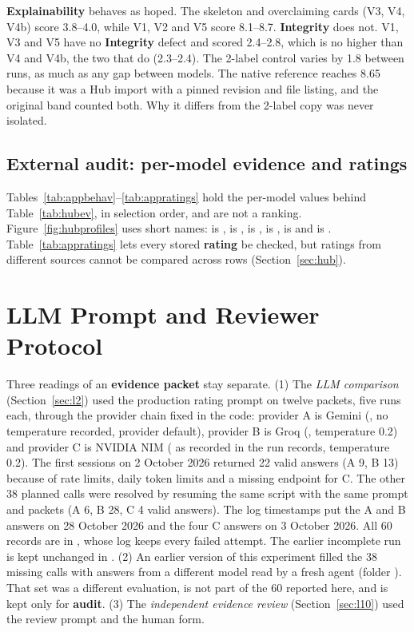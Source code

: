 \textbf{Explainability} behaves as hoped. The skeleton and overclaiming cards (V3, V4, V4b) score 3.8--4.0, while V1, V2 and V5 score 8.1--8.7. \textbf{Integrity} does not. V1, V3 and V5 have no \textbf{Integrity} defect and scored 2.4--2.8, which is no higher than V4 and V4b, the two that do (2.3--2.4). The 2-label control varies by 1.8 between runs, as much as any gap between models. The native reference reaches 8.65 because it was a Hub import with a pinned revision and file listing, and the original band counted both. Why it differs from the 2-label copy was never isolated.

\section{External audit: per-model evidence and ratings}
Tables~\ref{tab:appbehav}--\ref{tab:appratings} hold the per-model values behind Table~\ref{tab:hubev}, in selection order, and are not a ranking. Figure~\ref{fig:hubprofiles} uses short names: is ,  is ,  is ,  is ,  is  and  is . Table~\ref{tab:appratings} lets every stored \textbf{rating} be checked, but ratings from different sources cannot be compared across rows (Section~\ref{sec:hub}).



\chapter{LLM Prompt and Reviewer Protocol}\label{app:prompts}

Three readings of an \textbf{evidence packet} stay separate. (1) The \emph{LLM comparison} (Section~\ref{sec:l2}) used the production rating prompt on twelve packets, five runs each, through the provider chain fixed in the code: provider A is Gemini (, no temperature recorded, provider default), provider B is Groq (, temperature 0.2) and provider C is NVIDIA NIM ( as recorded in the run records, temperature 0.2). The first sessions on 2 October 2026 returned 22 valid answers (A 9, B 13) because of rate limits, daily token limits and a missing endpoint for C. The other 38 planned calls were resolved by resuming the same script with the same prompt and packets (A 6, B 28, C 4 valid answers). The log timestamps put the A and B answers on 28 October 2026 and the four C answers on 3 October 2026. All 60 records are in , whose log keeps every failed attempt. The earlier incomplete run is kept unchanged in . (2) An earlier version of this experiment filled the 38 missing calls with answers from a different model read by a fresh agent (folder ). That set was a different evaluation, is not part of the 60 reported here, and is kept only for \textbf{audit}. (3) The \emph{independent evidence review} (Section~\ref{sec:l10}) used the review prompt and the human form.


